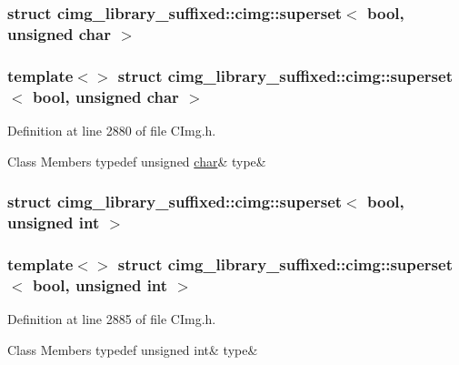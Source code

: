 \subsubsection{struct cimg\+\_\+library\+\_\+suffixed\+:\+:cimg\+:\+:superset$<$ bool, unsigned char $>$}
\subsubsection*{template$<$$>$\newline
struct cimg\+\_\+library\+\_\+suffixed\+::cimg\+::superset$<$ bool, unsigned char $>$}



Definition at line 2880 of file C\+Img.\+h.

\begin{DoxyFields}{Class Members}
\mbox{\label{namespacecimg__library__suffixed_1_1cimg_a85bd7a20e1c2e1ad0d8b964f473d5494}} 
typedef unsigned \hyperlink{classchar}{char}&
type&
\\
\hline

\end{DoxyFields}
\label{structcimg__library__suffixed_1_1cimg_1_1superset_3_01bool_00_01unsigned_01int_01_4}
\subsubsection{struct cimg\+\_\+library\+\_\+suffixed\+:\+:cimg\+:\+:superset$<$ bool, unsigned int $>$}
\subsubsection*{template$<$$>$\newline
struct cimg\+\_\+library\+\_\+suffixed\+::cimg\+::superset$<$ bool, unsigned int $>$}



Definition at line 2885 of file C\+Img.\+h.

\begin{DoxyFields}{Class Members}
\mbox{\label{namespacecimg__library__suffixed_1_1cimg_a1e9c2d39872148d655400d97fa9be87a}} 
typedef unsigned int&
type&
\\
\hline

\end{DoxyFields}
\label{structcimg__library__suffixed_1_1cimg_1_1superset_3_01bool_00_01unsigned_01short_01_4}
